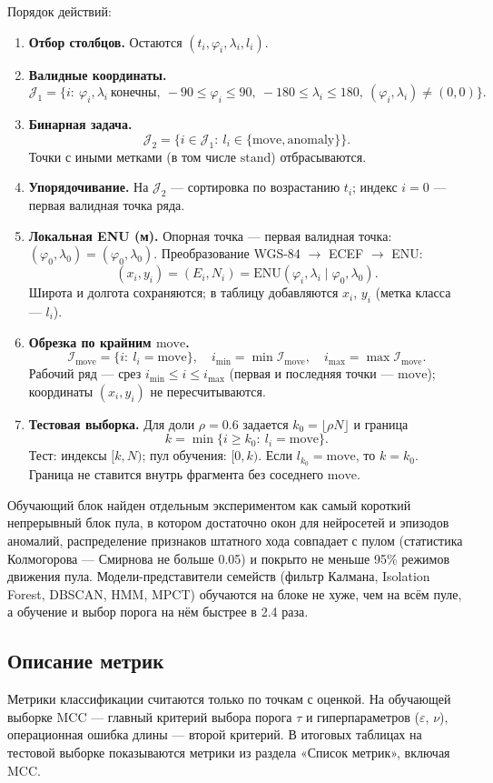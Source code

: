 \documentclass[a4paper,12pt]{report}
\begin{document}
	Порядок действий:
	\begin{enumerate}
		\item \textbf{Отбор столбцов.} Остаются $(t_i,\varphi_i,\lambda_i,l_i)$.
		\item \textbf{Валидные координаты.}
		\[\mathcal{J}_1=\{i:\ \varphi_i,\lambda_i\ \text{конечны},\ -90\le\varphi_i\le 90,\ -180\le\lambda_i\le 180,\ (\varphi_i,\lambda_i)\neq(0,0)\}.\]
		\item \textbf{Бинарная задача.}
		\[\mathcal{J}_2=\{i\in\mathcal{J}_1:\ l_i\in\{\mathrm{move},\mathrm{anomaly}\}\}.\]
		Точки с иными метками (в том числе $\mathrm{stand}$) отбрасываются.
		\item \textbf{Упорядочивание.} На $\mathcal{J}_2$ --- сортировка по возрастанию $t_i$; индекс $i=0$ --- первая валидная точка ряда.
		\item \textbf{Локальная ENU (м).} Опорная точка --- первая валидная точка: $(\varphi_0,\lambda_0)=(\varphi_{0},\lambda_{0})$. Преобразование WGS-84 $\rightarrow$ ECEF $\rightarrow$ ENU:
		\[(x_i,y_i)=(E_i,N_i)=\mathrm{ENU}(\varphi_i,\lambda_i\mid\varphi_0,\lambda_0).\]
		Широта и долгота сохраняются; в таблицу добавляются $x_i$, $y_i$ (метка класса --- $l_i$).
		\item \textbf{Обрезка по крайним $\mathrm{move}$.}
		\[\mathcal{I}_{\mathrm{move}}=\{i:\ l_i=\mathrm{move}\},\quad i_{\min}=\min\mathcal{I}_{\mathrm{move}},\quad i_{\max}=\max\mathcal{I}_{\mathrm{move}}.\]
		Рабочий ряд --- срез $i_{\min}\le i\le i_{\max}$ (первая и последняя точки --- $\mathrm{move}$); координаты $(x_i,y_i)$ не пересчитываются.
		\item \textbf{Тестовая выборка.} Для доли $\rho=0.6$ задается $k_0=\lfloor\rho N\rfloor$ и граница
		\[k=\min\{i\ge k_0:\ l_i=\mathrm{move}\}.\]
		Тест: индексы $[k,N)$; пул обучения: $[0,k)$. Если $l_{k_0}=\mathrm{move}$, то $k=k_0$. Граница не ставится внутрь фрагмента без соседнего $\mathrm{move}$.
	\end{enumerate}

	Обучающий блок найден отдельным экспериментом как самый короткий непрерывный блок пула, в котором достаточно окон для нейросетей и эпизодов аномалий, распределение признаков штатного хода совпадает с пулом (статистика Колмогорова --- Смирнова не больше 0.05) и покрыто не меньше 95\% режимов движения пула. Модели-представители семейств (фильтр Калмана, Isolation Forest, DBSCAN, HMM, MPCT) обучаются на блоке не хуже, чем на всём пуле, а обучение и выбор порога на нём быстрее в 2.4 раза.

	\subsection{Описание метрик}
	Метрики классификации считаются только по точкам с оценкой. На обучающей выборке MCC --- главный критерий выбора порога $\tau$ и гиперпараметров ($\varepsilon$, $\nu$), операционная ошибка длины --- второй критерий. В итоговых таблицах на тестовой выборке показываются метрики из раздела «Список метрик», включая MCC.
\end{document}

